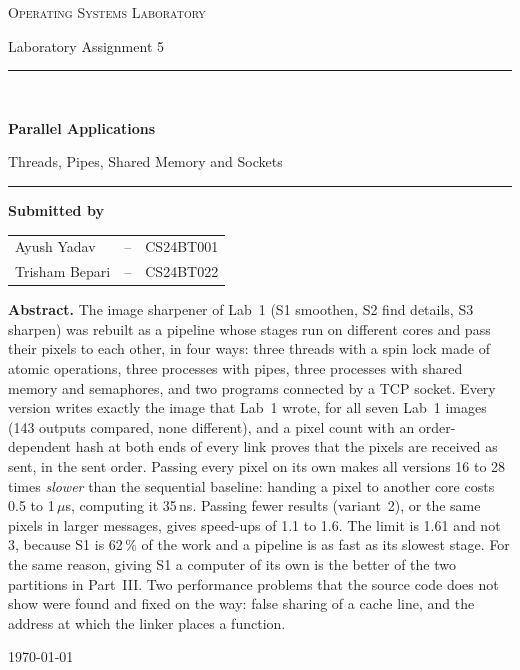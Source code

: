 \documentclass[11pt,a4paper]{article}
\begin{document}
\begin{titlepage}
\centering
\vspace*{1.2cm}
{\large\scshape Operating Systems Laboratory\par}
\vspace{0.3cm}
{\large Laboratory Assignment 5\par}
\vspace{2.4cm}
\rule{\textwidth}{1.2pt}\\[0.55cm]
{\Huge\bfseries Parallel Applications\par}
\vspace{0.35cm}
{\LARGE Threads, Pipes, Shared Memory and Sockets\par}
\vspace{0.55cm}
\rule{\textwidth}{1.2pt}
\vspace{2.6cm}

{\large\bfseries Submitted by\par}
\vspace{0.7cm}
{\large
\begin{tabular}{@{}lcl@{}}
Ayush Yadav       & \quad--\quad & CS24BT001\\[2mm]
Trisham Bepari    & \quad--\quad & CS24BT022\\
\end{tabular}\par}

\vfill
\begin{minipage}{0.88\textwidth}
\small
\noindent\textbf{Abstract.} The image sharpener of Lab~1 (S1 smoothen, S2 find
details, S3 sharpen) was rebuilt as a pipeline whose stages run on different cores and pass their
pixels to each other, in four ways: three threads with a spin lock made of atomic operations, three
processes with pipes, three processes with shared memory and semaphores, and two programs connected
by a TCP socket. Every version writes exactly the image that Lab~1 wrote, for all seven Lab~1
images (143 outputs compared, none different), and a pixel count with an order-dependent hash at
both ends of every link proves that the pixels are received as sent, in the sent order. Passing
every pixel on its own makes all versions 16 to 28 times \emph{slower} than the sequential
baseline: handing a pixel to another core costs 0.5 to 1\,$\mu$s, computing it 35\,ns. Passing
fewer results (variant~2), or the same pixels in larger messages, gives speed-ups of 1.1 to 1.6.
The limit is 1.61 and not 3, because S1 is 62\,\% of the work and a pipeline is as fast as its
slowest stage. For the same reason, giving S1 a computer of its own is the better of the two
partitions in Part~III. Two performance problems that the source code does not show were found
and fixed on the way: false sharing of a cache line, and the address at which the linker places a
function.
\end{minipage}
\vspace{1.2cm}

{\large \today\par}
\end{titlepage}
\end{document}
